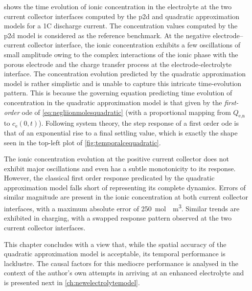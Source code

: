  shows  the time evolution of  ionic concentration
in  the electrolyte  at the  two current  collector interfaces  computed by  the
\gls{p2d} and  quadratic approximation  models for a  1C discharge  current. The
concentration  values computed  by  the  \gls{p2d} model  is  considered as  the
reference benchmark. At the negative electrode--current collector interface, the
ionic  concentration  exhibits  a  few oscillations  of  small  amplitude  owing
to  the complex  interactions  of  the ionic  phase  with  the porous  electrode
and  the charge  transfer process  at the  electrode-electrolyte interface.  The
concentration  evolution  predicted  by  the quadratic  approximation  model  is
rather  simplistic  and  is  unable to  capture  this  intricate  time-evolution
pattern.  This  is because  the  governing  equation predicting  time  evolution
of  concentration  in  the  quadratic  approximation  model  is  that  given  by
the  \emph{first-order}  \gls{ode} of \cref{eq:negliionmolesquadratic}  (with  a
proportional mapping from $Q_\text{e,n}$ to $c_\text{e}(0,t)$). Following system
theory, the step response  of a first order \gls{ode} is  that of an exponential
rise to a final settling value, which  is exactly the shape seen in the top-left
plot of \cref{fig:temporalcequadratic}.

The ionic  concentration evolution  at the positive  current collector  does not
exhibit major oscillations  and even has a subtle monotonicity  to its response.
However,  the  classical  first  order  response  predicated  by  the  quadratic
approximation model falls short of representing its complete dynamics. Errors of
similar  magnitude  are present  in  the  ionic  concentration at  both  current
collector  interfaces, with  a maximum  absolute error  of \approx\SI{250}{\mole
\per \meter  \cubed}. Similar trends are  exhibited in charging, with  a swapped
response pattern observed at the two current collector interfaces.

This  chapter concludes  with a  view that,  while the  spatial accuracy  of the
quadratic  approximation  model  is  acceptable,  its  temporal  performance  is
lacklustre. The causal factors for this  mediocre performance is analysed in the
context of the author's own attempts  in arriving at an enhanced electrolyte and
is presented next in \cref{ch:newelectrolytemodel}.

